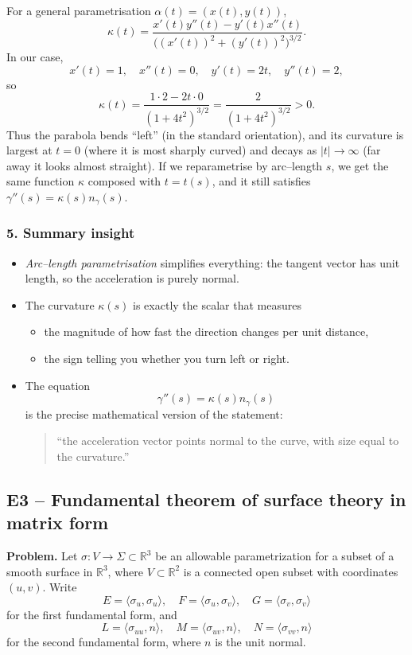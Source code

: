 \documentclass[12pt,a4paper]{article}
\theoremstyle{plain}
\theoremstyle{definition}      %
\begin{document}
	For a general parametrisation $\alpha(t)=(x(t),y(t))$,
	\[
	\kappa(t) = \frac{x'(t)y''(t) - y'(t)x''(t)}
	{\bigl((x'(t))^2+(y'(t))^2\bigr)^{3/2}}.
	\]
	In our case,
	\[
	x'(t)=1,\quad x''(t)=0,\quad y'(t)=2t,\quad y''(t)=2,
	\]
	so
	\[
	\kappa(t)=\frac{1\cdot 2 - 2t\cdot 0}{(1+4t^2)^{3/2}}
	= \frac{2}{(1+4t^2)^{3/2}} > 0.
	\]
	Thus the parabola bends ``left'' (in the standard orientation), and its
	curvature is largest at $t=0$ (where it is most sharply curved) and decays as
	$|t|\to\infty$ (far away it looks almost straight).  If we reparametrise by
	arc--length $s$, we get the same function $\kappa$ composed with $t=t(s)$, and
	it still satisfies $\gamma''(s)=\kappa(s)n_\gamma(s)$.
	
	\subsubsection*{5. Summary insight}
	
	\begin{itemize}
		\item \emph{Arc--length parametrisation} simplifies everything: the tangent
		vector has unit length, so the acceleration is purely normal.
		\item The curvature $\kappa(s)$ is exactly the scalar that measures
		\begin{itemize}
			\item the magnitude of how fast the direction changes per unit distance,
			\item the sign telling you whether you turn left or right.
		\end{itemize}
		\item The equation
		\[
		\gamma''(s)=\kappa(s)n_\gamma(s)
		\]
		is the precise mathematical version of the statement:
		\begin{quote}
			``the acceleration vector points normal to the curve, with size equal to
			the curvature.''
		\end{quote}
	\end{itemize}
	
	
	\subsection*{E3 – Fundamental theorem of surface theory in matrix form}
	
	\textbf{Problem.}
	Let $\sigma:V\to\Sigma\subset\mathbb{R}^3$ be an allowable parametrization for a
	subset of a smooth surface in $\mathbb{R}^3$, where
	$V\subset\mathbb{R}^2$ is a connected open subset with coordinates $(u,v)$.
	Write
	\[
	E=\langle\sigma_u,\sigma_u\rangle,\quad
	F=\langle\sigma_u,\sigma_v\rangle,\quad
	G=\langle\sigma_v,\sigma_v\rangle
	\]
	for the first fundamental form, and
	\[
	L=\langle\sigma_{uu},n\rangle,\quad
	M=\langle\sigma_{uv},n\rangle,\quad
	N=\langle\sigma_{vv},n\rangle
	\]
	for the second fundamental form, where $n$ is the unit normal.
	
\end{document}

